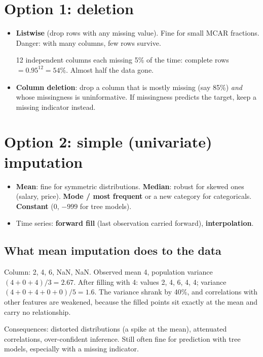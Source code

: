 \section{Option 1: deletion}
\begin{itemize}
\item \textbf{Listwise} (drop rows with any missing value). Fine for small MCAR fractions. Danger: with many columns, few rows survive.
  \begin{example}
  12 independent columns each missing 5\% of the time: complete rows $= 0.95^{12} = 54\%$. Almost half the data gone.
  \end{example}
\item \textbf{Column deletion}: drop a column that is mostly missing (say 85\%) \emph{and} whose missingness is uninformative.
  If missingness predicts the target, keep a missing indicator instead.
\end{itemize}

\section{Option 2: simple (univariate) imputation}
\begin{itemize}
\item \textbf{Mean}: fine for symmetric distributions. \textbf{Median}: robust for skewed ones (salary, price).
  \textbf{Mode / most frequent} or a new category  for categoricals. \textbf{Constant} (0, $-999$ for tree models).
\item Time series: \textbf{forward fill} (last observation carried forward), \textbf{interpolation}.
\end{itemize}

\subsection{What mean imputation does to the data}
\begin{example}
Column: 2, 4, 6, NaN, NaN. Observed mean 4, population variance $(4 + 0 + 4)/3 = 2.67$. After filling with 4: values 2, 4, 6, 4, 4;
variance $(4 + 0 + 4 + 0 + 0)/5 = 1.6$. The variance shrank by 40\%, and correlations with other features are weakened, because the
filled points sit exactly at the mean and carry no relationship.
\end{example}
Consequences: distorted distributions (a spike at the mean), attenuated correlations, over-confident inference. Still often fine for
prediction with tree models, especially with a missing indicator.

